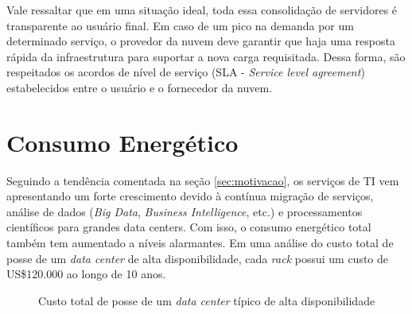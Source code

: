 Vale ressaltar que em uma situação ideal, toda essa consolidação de servidores
é transparente ao usuário final. Em caso de um pico na demanda por um determinado
serviço, o provedor da nuvem deve garantir que haja uma resposta rápida da 
infraestrutura para suportar a nova carga requisitada. Dessa forma, são 
respeitados os acordos de nível de serviço (SLA - \emph{Service level agreement})
estabelecidos entre o usuário e o fornecedor da nuvem.

\section{Consumo Energético}
\label{sec:consumo_energetico}

Seguindo a tendência comentada na seção \ref{sec:motivacao}, os serviços de TI
vem apresentando um forte crescimento devido à contínua migração de serviços,
análise de dados (\emph{Big Data}, \emph{Business Intelligence}, etc.) e
processamentos científicos para grandes data centers. Com isso, o consumo
energético total também tem aumentado a níveis alarmantes. Em uma análise do custo
total de posse de um \emph{data center} de alta disponibilidade, cada \emph{rack}
possui um custo de US\$120.000 ao longo de 10 anos. \cite{rasmussen:tco_data_center} 

\newcommand{\slice}[4]{
  \pgfmathparse{0.5*#1+0.5*#2}
  \let\midangle\pgfmathresult

  \draw[thick,fill=black!10] (0,0) -- (#1:1) arc (#1:#2:1) -- cycle;

  \node[label=\midangle:#4] at (\midangle:1) {};

  \pgfmathparse{min((#2-#1-10)/110*(-0.3),0)}
  \let\temp\pgfmathresult
  \pgfmathparse{max(\temp,-0.5) + 0.8}
  \let\innerpos\pgfmathresult
  \node at (\midangle:\innerpos) {#3};
}

\begin{figure}
\centering
{}
\caption{Custo total de posse de um \emph{data center} típico de alta
disponibilidade \cite{rasmussen:tco_data_center}} \label{fig:tco_data_center}
\end{figure}

